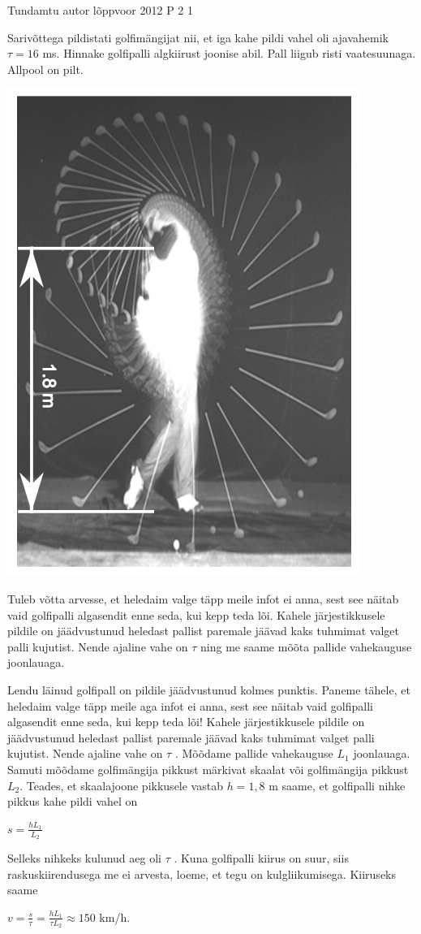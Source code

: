 {Tundamtu autor} %
{lõppvoor} %
{2012} %
{P 2} %
{1} %
{

\ifStatement
Sarivõttega pildistati golfimängijat nii, et iga kahe pildi vahel oli ajavahemik $\tau = 16$ ms. Hinnake golfipalli algkiirust joonise abil. Pall liigub risti vaatesuunaga. Allpool on pilt.
\begin{center}
	\includegraphics[width=0.5\linewidth]{2012-v3p-02-yl.PNG}
\end{center}
\fi

\ifHint
Tuleb võtta arvesse, et heledaim valge täpp meile infot ei anna, sest see näitab vaid golfipalli algasendit enne seda, kui kepp teda lõi. Kahele järjestikkusele pildile on jäädvustunud heledast pallist paremale jäävad kaks tuhmimat valget palli kujutist. Nende ajaline vahe on $\tau$ ning me saame mõõta pallide vahekauguse joonlauaga.
\fi

\ifSolution
Lendu läinud golfipall on pildile jäädvustunud kolmes punktis. Paneme tähele, et heledaim valge täpp meile aga infot ei anna, sest see näitab vaid golfipalli algasendit enne seda, kui kepp teda lõi! Kahele järjestikkusele pildile on jäädvustunud heledast pallist paremale jäävad kaks tuhmimat valget palli kujutist. Nende ajaline vahe on $\tau$ . Mõõdame pallide vahekauguse $L_1$ joonlauaga. Samuti mõõdame golfimängija pikkust märkivat skaalat või golfimängija pikkust $L_2$. Teades, et skaalajoone pikkusele vastab $h = 1,8$ m saame, et golfipalli nihke pikkus kahe pildi vahel on
\begin{center}
$s = \frac{hL_1}{L_2}$
\end{center}
Selleks nihkeks kulunud aeg oli $\tau$ . Kuna golfipalli kiirus on suur, siis raskuskiirendusega me ei arvesta, loeme, et tegu on kulgliikumisega. Kiiruseks saame
\begin{center}
$v = \frac{s}{\tau} = \frac{hL_1}{\tau L_2} \approx 150$ km/h.
\end{center}
\fi
}
